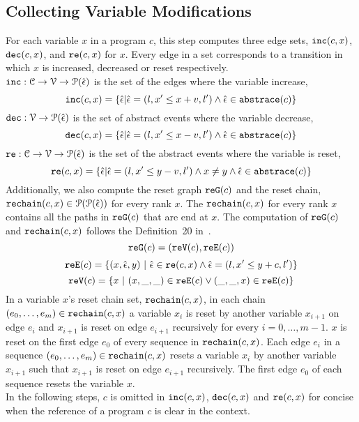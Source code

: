   \subsection{Collecting Variable Modifications}
  For each variable $x$ in a program $c$, this step computes three edge sets, $\mathtt{inc}(c, x)$, $\mathtt{dec}(c, x)$,
  and $\mathtt{re}(c, x)$ for $x$.
  Every edge in a set corresponds to a transition in which $x$ is increased,
  decreased
  or reset
  respectively.
  \\
  $\mathtt{inc}: \mathcal{C} \to \mathcal{V} \to \mathcal{P}(\hat{\mathtt{\epsilon}{}}) $
  is the set of the edges where the variable increase, 
  \[ \inc(c, x) = \left\{ \absevent | \absevent = (l, x' \leq x + v, l') \land \absevent \in \absflow(c) \right\} \]
  $\mathtt{dec}: \mathcal{V} \to \mathcal{P}(\hat{\mathtt{\epsilon}{}}) $
  is the set of abstract events where the variable decrease,
  \[\dec(c, x) = \left\{\absevent| \absevent = (l,  x' \leq x - v, l') \land \absevent \in \absflow(c) \right\}\]
  $\mathtt{re}: \mathcal{C} \to \mathcal{V} \to \mathcal{P}(\hat{\mathtt{\epsilon}{}}) $ is the set of the abstract events where the variable is reset,
%
  \[\reset(c, x) = \left\{ \absevent| \absevent = (l,  x' \leq y - v, l') \land x \neq y \land \absevent \in \absflow(c) \right\}\]
  Additionally,
  we also compute the reset graph $\mathtt{re{G}}(c)$ and the reset chain, $\mathtt{rechain}(c, x) \in \mathcal{P}(\mathcal{P}(\hat{\mathtt{\epsilon}{}}))$ for every rank $x$.
  The $\mathtt{rechain}(c, x)$ for every rank $x$ contains all the paths in $\mathtt{re{G}}(c)$ that are end at $x$.
  The computation of $\mathtt{re{G}}(c)$ and $\mathtt{rechain}(c, x)$ follows the Definition~20 in~\cite{SinnZV17}.
  \[\mathtt{re{G}}(c) = (\mathtt{re{V}}(c), \mathtt{re{E}}(c))\]
  \[\resetE(c) = \left\{ (x, \absevent, y) ~\vert~ \absevent \in \reset(c, x) \land \absevent = (l, x' \leq y + c, l') \right\} \]
  \[\resetV(c) = \left\{ x ~\vert~ (x, \_, \_) \in \resetE(c) \lor (\_, \_, x) \in \resetE(c) \right\} \]
  In a variable $x$'s reset chain set, $\mathtt{rechain}(c, x)$, in each chain $(e_0, \ldots, e_m) \in \mathtt{rechain}(c, x)$
  a variable $x_i$ is reset by another variable $x_{i + 1}$ on edge $e_{i}$
  and $x_{i + 1}$ is reset on edge $e_{i + 1}$ recursively
  for every $i = 0, \ldots, m - 1$.
  $x$ is reset on the first edge $e_0$ of every sequence in $\mathtt{rechain}(c, x)$.
  {Each edge $e_i$ in a sequence $(e_0, \ldots, e_m) \in \mathtt{rechain}(c, x)$
  resets a variable $x_i$ by another variable $x_{i + 1}$ such that $x_{i + 1}$
  is reset on edge $e_{i + 1}$ recursively. The first edge $e_0$ of each sequence resets the variable $x$.}
  \\
  In the following steps, $c$ is omitted in $\mathtt{inc}(c, x)$,
  $\mathtt{dec}(c, x)$ and $\mathtt{re}(c, x)$ for concise when the reference of a program $c$ is clear in the context.

